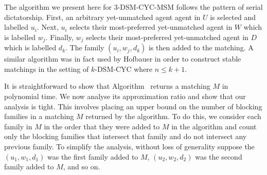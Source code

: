 The algorithm we present here for 3-DSM-CYC-MSM follows the pattern of serial dictatorship. First, an arbitrary yet-unmatched agent agent in $U$ is selected and labelled $u_i$. Next, $u_i$ selects their most-preferred yet-unmatched agent in $W$ which is labelled $w_j$. Finally, $w_j$ selects their most-preferred yet-unmatched agent in $D$ which is labelled $d_k$. The family $( u_i, w_j, d_k )$ is then added to the matching. A similar algorithm was in fact used by Hofbauer \cite{HOFBAUER201672} in order to construct stable matchings in the setting of $k$-DSM-CYC where $n \leq k + 1$.



It is straightforward to show that Algorithm~ returns a matching $M$ in polynomial time. We now analyse its approximation ratio and show that our analysis is tight. This involves placing an upper bound on the number of blocking families in a matching $M$ returned by the algorithm. To do this, we consider each family in $M$ in the order that they were added to $M$ in the algorithm and count only the blocking families that intersect that family and do not intersect any previous family. To simplify the analysis, without loss of generality suppose the $( u_1, w_1, d_1 )$ was the first family added to $M$, $( u_2, w_2, d_2 )$ was the second family added to $M$, and so on.

